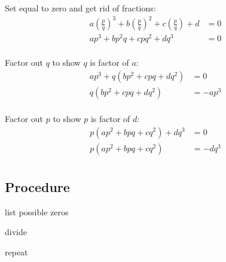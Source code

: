 \documentclass{exam}
\begin{document}
  Set equal to zero and get rid of fractions:
  \begin{align*}
    a \left( \frac{p}{q} \right)^3 + b \left( \frac{p}{q} \right)^2 + c \left( \frac{p}{q} \right) + d &= 0 \\
    ap^3 + bp^2q + cpq^2 + dq^3                                                                        &= 0 \\
  \end{align*}

  Factor out $q$ to show $q$ is factor of $a$:
  \begin{align*}
    ap^3 + q(bp^2 + cpq + dq^2) &= 0 \\
    q(bp^2 + cpq + dq^2)        &= -ap^3 \\
  \end{align*}

  Factor out $p$ to show $p$ is factor of $d$:
  \begin{align*}
    p(ap^2 + bpq + cq^2) + dq^3 &= 0 \\
    p(ap^2 + bpq + cq^2)        &= -dq^3  \\
  \end{align*}


  \subsection{Procedure}
  \begin{itemize*}
    \item list possible zeros
    \item divide
    \item repeat
  \end{itemize*}
\end{document}
